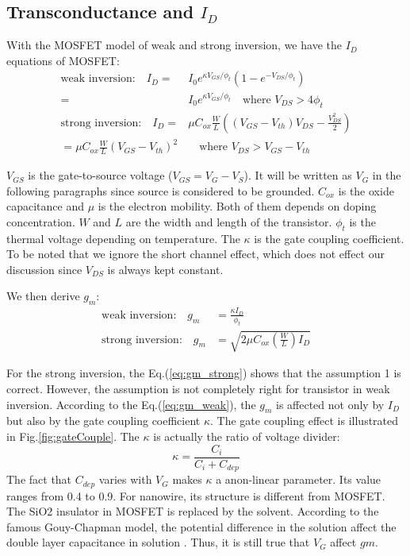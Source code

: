 \subsection{Transconductance and $I_D$} \label{section:IdGm}
With the MOSFET model of weak and strong inversion, we have the $I_D$ equations of MOSFET:
\setlength{\mathindent}{1.5cm}
\begin{align}
    \text{weak inversion:} \quad I_D   = & I_0e^{\kappa V_{GS}/\phi_t}(1 - e^{-V_{DS}/\phi_t})  \label{eq:Ikappa} \\
                                       = & I_0e^{\kappa V_{GS}/\phi_t} \quad \text{where $V_{DS} > 4 \phi_t$ } \\
    \text{strong inversion:} \quad I_D = & \mu C_{ox} \frac{W}{L}((V_{GS} - V_{th})V_{DS} - \frac{V_{DS}^2}{2}) \\
                                       = \mu C_{ox} \frac{W}{L}(V_{GS} - V_{th})^2 &\quad \text{where $V_{DS} > V_{GS} - V_{th}$} \label{eq:ID_Strong}
\end{align}

$V_{GS}$ is the gate-to-source voltage ($V_{GS} = V_G - V_S$).
It will be written as $V_G$ in the following paragraphs since source is considered to be grounded.
$C_{ox}$ is the oxide capacitance and $\mu$ is the electron mobility.
Both of them depends on doping concentration.
$W$ and $L$ are the width and length of the transistor.
$\phi_t$ is the thermal voltage depending on temperature.
The $\kappa$ is the gate coupling coefficient.
To be noted that we ignore the short channel effect, which does not effect our discussion since $V_{DS}$ is always kept constant.

We then derive $g_m$:
\begin{align}
    \text{weak inversion:} \quad g_m & = \frac{\kappa I_D}{\phi_t} \label{eq:gm_weak} \\
    \text{strong inversion:} \quad g_m & = \sqrt{2 \mu C_{ox} (\frac{W}{L})I_{D}} \label{eq:gm_strong}
\end{align}

For the strong inversion, the Eq.(\ref{eq:gm_strong}) shows that the assumption 1 is correct.
However, the assumption is not completely right for transistor in weak inversion.
According to the Eq.(\ref{eq:gm_weak}), the $g_m$ is affected not only by $I_D$ but also by the gate coupling coefficient $\kappa$.
The gate coupling effect is illustrated in Fig.\ref{fig:gateCouple}.
The $\kappa$ is actually the ratio of voltage divider:
\begin{equation}
    \kappa = \frac{C_i}{C_i + C_{dep}}
\end{equation}
The fact that $C_{dep}$ varies with $V_G$ makes $\kappa$ a anon-linear parameter.
Its value ranges from 0.4 to 0.9.
For nanowire, its structure is different from MOSFET.
The SiO2 insulator in MOSFET is replaced by the solvent.
According to the famous Gouy-Chapman model, the potential difference in the solution affect the double layer capacitance in solution \cite{ElecChem}.
Thus, it is still true that $V_G$ affect $gm$.

